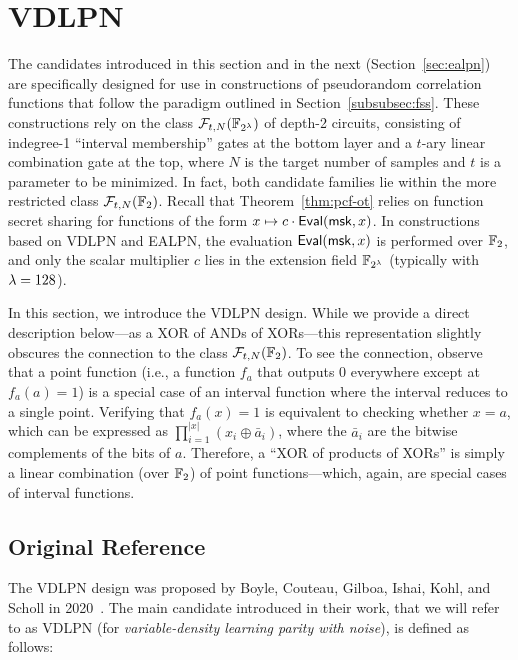 \section{VDLPN}
\label{sec:vdlpn}

The candidates introduced in this section and in the next (Section~\ref{sec:ealpn}) are specifically designed for use in constructions of pseudorandom correlation functions that follow the paradigm outlined in Section~\ref{subsubsec:fss}. These constructions rely on the class $\mathcal{F}_{t,N}(\mathbb{F}_{2^\lambda})$ of depth-2 circuits, consisting of indegree-1 ``interval membership'' gates at the bottom layer and a $t$-ary linear combination gate at the top, where $N$ is the target number of samples and $t$ is a parameter to be minimized. In fact, both candidate families lie within the more restricted class $\mathcal{F}_{t,N}(\mathbb{F}_2)$. Recall that Theorem~\ref{thm:pcf-ot} relies on function secret sharing for functions of the form $x \mapsto c \cdot \mathsf{Eval}(\mathsf{msk},x)$. In constructions based on {\sf VDLPN} and {\sf EALPN}, the evaluation $\mathsf{Eval}(\mathsf{msk},x)$ is performed over $\mathbb{F}_2$, and only the scalar multiplier $c$ lies in the extension field $\mathbb{F}_{2^\lambda}$ (typically with $\lambda = 128$).

In this section, we introduce the {\sf VDLPN} design. While we provide a direct description below—as a XOR of ANDs of XORs—this representation slightly obscures the connection to the class $\mathcal{F}_{t,N}(\mathbb{F}_{2})$. To see the connection, observe that a point function (i.e., a function $f_a$ that outputs $0$ everywhere except at $f_a(a) = 1$) is a special case of an interval function where the interval reduces to a single point. Verifying that $f_a(x) = 1$ is equivalent to checking whether $x = a$, which can be expressed as $\prod_{i=1}^{|x|} (x_i \oplus \bar{a}_i)$, where the $\bar{a}_i$ are the bitwise complements of the bits of $a$. Therefore, a “XOR of products of XORs” is simply a linear combination (over $\mathbb{F}_2$) of point functions—which, again, are special cases of interval functions.


\subsection{Original Reference}

The {\sf VDLPN} design was proposed by Boyle, Couteau, Gilboa, Ishai, Kohl, and Scholl in 2020~\cite{vdlpn}. The main candidate introduced in their work, that we will refer to as {\sf VDLPN} (for \emph{variable-density learning parity with noise}), is defined as follows:

